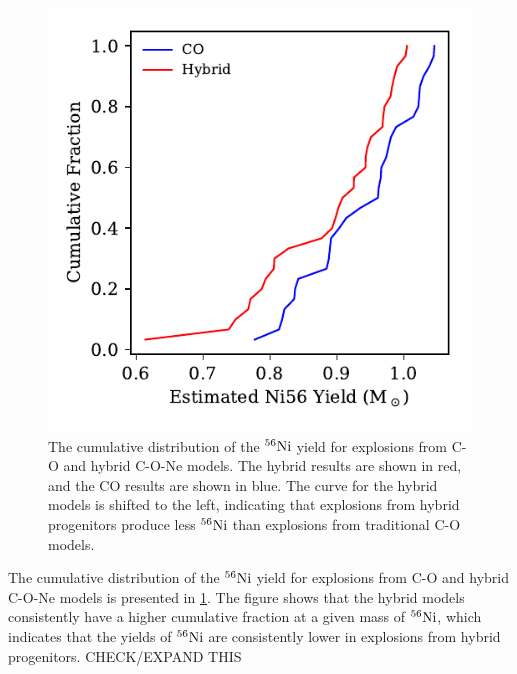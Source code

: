 \documentclass[iop,apj]{emulateapj}
\newcommand{\Ni}[1]{\ensuremath{{}^{#1}{\rm Ni}}}
\begin{document}
\begin{figure}
\includegraphics[width=\columnwidth]{figures/ni56_yield_cum_dist.pdf}
\caption{\label{fig:cumdist}
The cumulative distribution of the \Ni{56} yield for explosions from
C-O and hybrid C-O-Ne models. The hybrid results are shown in red, and the CO
results are shown in blue. The curve for the hybrid models is shifted 
to the left, indicating that explosions from hybrid progenitors produce
less \Ni{56} than explosions from traditional C-O models. 
}
\end{figure}
The cumulative distribution of the \Ni{56} yield for explosions from
C-O and hybrid C-O-Ne models is presented in \ref{fig:cumdist}. 
The figure shows that the hybrid models consistently have a higher
cumulative fraction at a given mass of \Ni{56}, which indicates
that the yields of \Ni{56} are consistently lower in explosions 
from hybrid progenitors. {\color{red} CHECK/EXPAND THIS}
\end{document}
